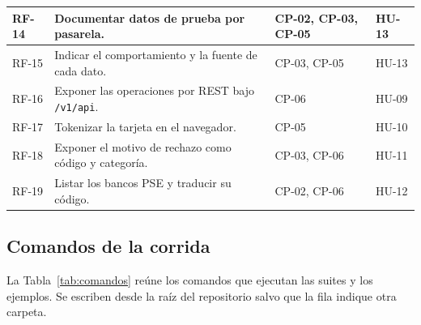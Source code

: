 {\begin{longtable}{|>{\raggedright\arraybackslash}p{1.3cm}|>{\raggedright\arraybackslash}p{7.2cm}|>{\raggedright\arraybackslash}p{3.1cm}|>{\raggedright\arraybackslash}p{3.1cm}|}
RF-14 & Documentar datos de prueba por pasarela. & CP-02, CP-03, CP-05 & HU-13 \\ \hline
RF-15 & Indicar el comportamiento y la fuente de cada dato. & CP-03, CP-05 & HU-13 \\ \hline
RF-16 & Exponer las operaciones por REST bajo \texttt{/v1/api}. & CP-06 & HU-09 \\ \hline
RF-17 & Tokenizar la tarjeta en el navegador. & CP-05 & HU-10 \\ \hline
RF-18 & Exponer el motivo de rechazo como código y categoría. & CP-03, CP-06 & HU-11 \\ \hline
RF-19 & Listar los bancos PSE y traducir su código. & CP-02, CP-06 & HU-12 \\ \hline
\end{longtable}
}

\subsection{Comandos de la corrida}

La Tabla~\ref{tab:comandos} reúne los comandos que ejecutan las suites y los ejemplos. Se escriben desde la raíz del repositorio salvo que la fila indique otra carpeta.

